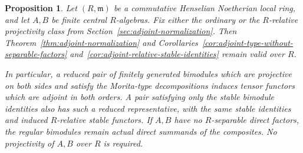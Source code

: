 \documentclass[12pt,a4paper,english,reqno]{amsart}
\numberwithin{equation}{section}
\theoremstyle{plain}
\newtheorem{proposition}[theorem]{Proposition}
\theoremstyle{definition}
\begin{document}
\begin{proposition}
\label{prop:adjoint-complete-base-extension}
Let $(R,\mathfrak m)$ be a commutative Henselian Noetherian local
ring, and let $A,B$ be finite central $R$-algebras.  Fix either the
ordinary or the $R$-relative projectivity class from
Section~\ref{sec:adjoint-normalization}.
Then Theorem~\ref{thm:adjoint-normalization} and
Corollaries~\ref{cor:adjoint-type-without-separable-factors}
and~\ref{cor:adjoint-relative-stable-identities} remain valid over
$R$.

In particular, a reduced pair of finitely generated bimodules which are
projective on both sides and satisfy the Morita-type decompositions
induces tensor functors which are adjoint in both orders.  A pair
satisfying only the stable bimodule identities also has such a reduced
representative, with the same stable identities and induced
$R$-relative stable functors.  If $A,B$ have no $R$-separable direct
factors, the regular bimodules remain actual direct summands of the
composites.  No projectivity of $A,B$ over $R$ is required.
\end{proposition}
\end{document}
